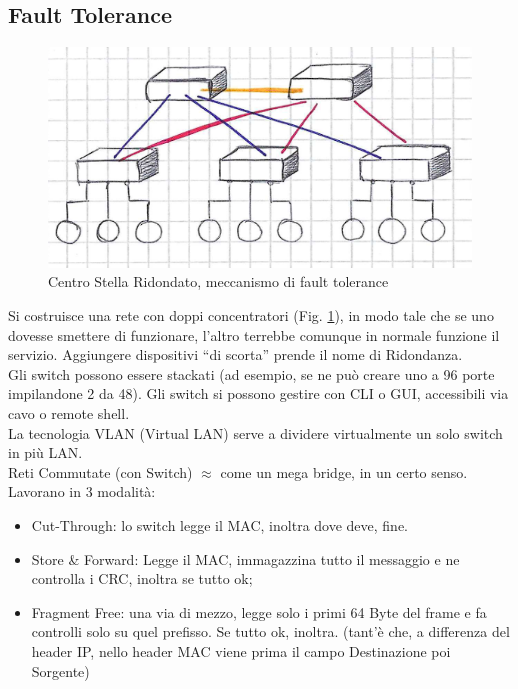 \subsection*{Fault Tolerance}
\begin{figure}
    \centering
    \includegraphics[width=0.75\linewidth]{Figures/06/ft.png}
    \caption{Centro Stella Ridondato, meccanismo di fault tolerance}
    \label{fig:06csr}
\end{figure}
\noindent Si costruisce una rete con doppi concentratori (Fig. \ref{fig:06csr}), in modo tale che se uno dovesse smettere di funzionare, l'altro terrebbe comunque in normale funzione il servizio. Aggiungere dispositivi ``di scorta'' prende il nome di Ridondanza.\\
\noindent Gli switch possono essere stackati (ad esempio, se ne può creare uno a 96 porte impilandone 2 da 48). Gli switch si possono gestire con CLI o GUI, accessibili via cavo o remote shell.\\ 
\noindent La tecnologia VLAN (Virtual LAN) serve a dividere virtualmente un solo switch in più LAN.\\
\noindent Reti Commutate (con Switch) $\approx$ come un mega bridge, in un certo senso. Lavorano in 3 modalità:
\begin{itemize}
    \item Cut-Through: lo switch legge il MAC, inoltra dove deve, fine.
    \item Store \& Forward: Legge il MAC, immagazzina tutto il messaggio e ne controlla i CRC, inoltra se tutto ok;
    \item Fragment Free: una via di mezzo, legge solo i primi 64 Byte del frame e fa controlli solo su quel prefisso. Se tutto ok, inoltra. (tant'è che, a differenza del header IP, nello header MAC viene prima il campo Destinazione poi Sorgente)
\end{itemize}
